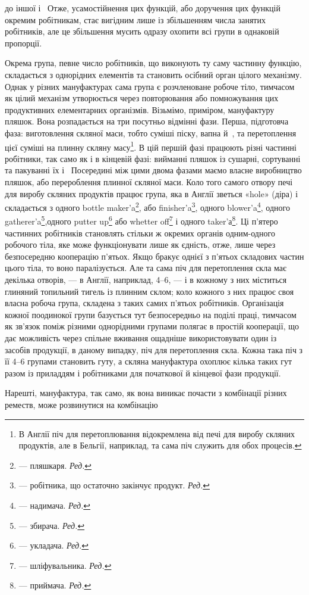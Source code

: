 \parcont{}  %
до іншої і~ Отже, усамостійнення цих функцій, або доручення
цих функцій окремим робітникам, стає вигідним лише із збільшенням
числа занятих робітників, але це збільшення мусить
одразу охопити всі групи в однаковій пропорції.

Окрема група, певне число робітників, що виконують ту саму
частинну функцію, складається з однорідних елементів та становить
осібний орган цілого механізму. Однак у різних мануфактурах
сама група є розчленоване робоче тіло, тимчасом як цілий
механізм утворюється через повторювання або помножування
цих продуктивних елементарних організмів. Візьмімо, приміром,
мануфактуру пляшок. Вона розпадається на три посутньо відмінні
фази. Перша, підготовча фаза: виготовлення скляної маси,
тобто суміші піску, вапна й~, та перетоплення цієї суміші
на плинну скляну масу\footnote{
В Англії піч для перетоплювання відокремлена від печі для виробу
скляних продуктів, але в Бельгії, наприклад, та сама піч служить
для обох процесів.
}. В цій першій фазі працюють різні
частинні робітники, так само як і в кінцевій фазі: вийманні
пляшок із сушарні, сортуванні та пакуванні їх і~ Посередині
між цими двома фазами маємо власне виробництво пляшок, або
перероблення плинної скляної маси. Коло того самого отвору
печі для виробу скляних продуктів працює група, яка в Англії
зветься «hole» (діра) і складається з одного bottle maker’a\footnote*{
— пляшкаря. \emph{Ред.}
},
або finisher’a\footnote*{
— робітника, що остаточно закінчує продукт. \emph{Ред.}
}, одного blower’a\footnote*{
— надимача. \emph{Ред.}
}, одного gatherer’a\footnote*{
— збирача. \emph{Ред.}
},одного
putter up\footnote*{
— укладача. \emph{Ред.}
} або whetter off\footnote*{
— шліфувальника. \emph{Ред.}
} і одного taker’а\footnote*{
— приймача. \emph{Ред.}
}.
Ці п’ятеро частинних робітників становлять стільки ж окремих
органів одним-одного робочого тіла, яке може функціонувати лише
як єдність, отже, лише через безпосередню кооперацію п’ятьох.
Якщо бракує однієї з п’ятьох складових частин цього тіла, то
воно паралізується. Але та сама піч для перетоплення скла має декілька
отворів, — в Англії, наприклад, 4--6, — і в кожному з них
міститься глиняний топильний тигель із плинним склом; коло кожного
з них працює своя власна робоча група, складена з таких самих
п’ятьох робітників. Організація кожної поодинокої групи базується
тут безпосередньо на поділі праці, тимчасом як зв’язок поміж
різними однорідними групами полягає в простій кооперації,
що дає можливість через спільне вживання ощадніше використовувати
один із засобів продукції, в даному випадку, піч для перетоплення
скла. Кожна така піч з її 4--6 групами становить гуту,
а скляна мануфактура охоплює кілька таких гут разом із приладдям
і робітниками для початкової й кінцевої фази продукції.

Нарешті, мануфактура, так само, як вона виникає почасти
з комбінації різних реместв, може розвинутися на комбінацію
\parbreak{}  %
